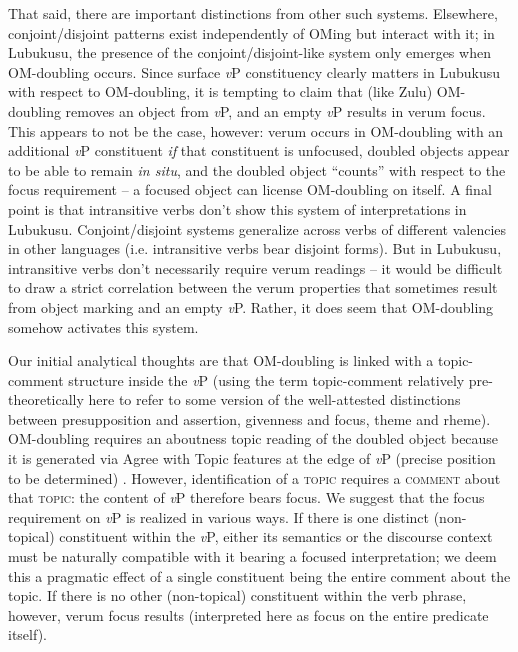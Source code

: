 \documentclass[output=paper]{langscibook}
\begin{document}
That said, there are important distinctions from other such systems. Elsewhere, conjoint/disjoint patterns exist independently of OMing but interact with it; in Lubukusu, the presence of the conjoint/disjoint-like system only emerges when  OM-doubling occurs. Since surface \textit{v}P constituency clearly matters in Lubukusu with respect to OM-doubling, it is tempting to claim that (like Zulu) OM-doubling removes an object from \textit{v}P, and an empty \textit{v}P results in verum focus. This appears to not be the case, however: verum occurs in OM-doubling with an additional \textit{v}P constituent \textit{if} that constituent is unfocused, doubled objects appear to be able to remain \textit{in situ}, and the doubled object ``counts'' with respect to the focus requirement -- a focused object can license OM-doubling on itself. A final point is that intransitive verbs don't show this system of interpretations in Lubukusu. Conjoint/disjoint systems generalize across verbs of different valencies in other languages (i.e. intransitive verbs bear disjoint forms). But in Lubukusu, intransitive verbs don't necessarily require verum readings -- it would be difficult to draw a strict correlation between the verum properties that sometimes result from object marking and an empty \textit{v}P. Rather, it does seem that OM-doubling somehow activates this system.

Our initial analytical thoughts are that OM-doubling is linked with a topic-comment structure inside the \textit{v}P (using the term topic-comment relatively pre-theoretically here to refer to some version of the well-attested distinctions between presupposition and assertion, givenness and focus, theme and rheme). OM-doubling requires an aboutness topic reading of the doubled object because it is generated via Agree with Topic features at the edge of \textit{v}P (precise position to be determined) \citep[see][]{Mursell:2018:SwahiliOmTopic}. However, identification of a \textsc{topic} requires a \textsc{comment} about that \textsc{topic}: the content of \textit{v}P therefore bears focus. We suggest that the focus requirement on \textit{v}P is realized in various ways. If there is one distinct (non-topical) constituent within the \textit{v}P, either its semantics or the discourse context must be naturally compatible with it bearing a focused interpretation; we deem this a pragmatic effect of a single constituent being the entire comment about the topic. If there is no other (non-topical) constituent within the verb phrase, however, verum focus results (interpreted here as focus on the entire predicate itself).
\end{document}
